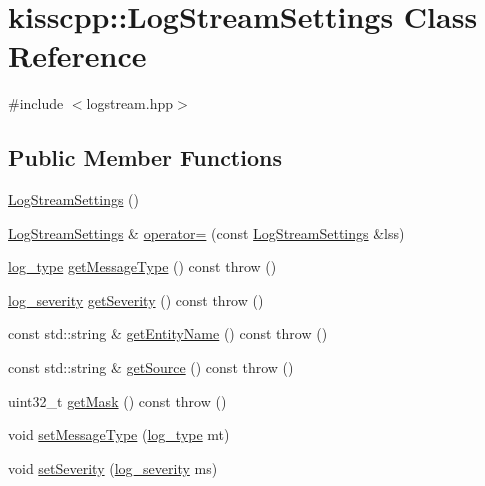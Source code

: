 \hypertarget{classkisscpp_1_1_log_stream_settings}{\section{kisscpp\-:\-:Log\-Stream\-Settings Class Reference}
\label{classkisscpp_1_1_log_stream_settings}
}


{\ttfamily \#include $<$logstream.\-hpp$>$}

\subsection*{Public Member Functions}
\begin{DoxyCompactItemize}
\item 
\hyperlink{classkisscpp_1_1_log_stream_settings_ae0d0e39dbc8875294d0b28579138bdd5}{Log\-Stream\-Settings} ()
\item 
\hyperlink{classkisscpp_1_1_log_stream_settings}{Log\-Stream\-Settings} \& \hyperlink{classkisscpp_1_1_log_stream_settings_ac0fcc9f978329329f027a251620fe3d2}{operator=} (const \hyperlink{classkisscpp_1_1_log_stream_settings}{Log\-Stream\-Settings} \&lss)
\item 
\hyperlink{namespacekisscpp_a18db16d1f4c281bec16e637c56b0cc88}{log\-\_\-type} \hyperlink{classkisscpp_1_1_log_stream_settings_a47d6a4154439d6e4618ddc8fe27df290}{get\-Message\-Type} () const   throw ()
\item 
\hyperlink{namespacekisscpp_a2479a56cdedf21357ca5c68adc699d00}{log\-\_\-severity} \hyperlink{classkisscpp_1_1_log_stream_settings_a601620fefa23f83bdd309a902689e851}{get\-Severity} () const   throw ()
\item 
const std\-::string \& \hyperlink{classkisscpp_1_1_log_stream_settings_a96e829a671c13d1895f64ea34735140f}{get\-Entity\-Name} () const   throw ()
\item 
const std\-::string \& \hyperlink{classkisscpp_1_1_log_stream_settings_a80153606d7e53c45cb3a05a99d770fb2}{get\-Source} () const   throw ()
\item 
uint32\-\_\-t \hyperlink{classkisscpp_1_1_log_stream_settings_ae82b178a57c244164c9c259fefcc218a}{get\-Mask} () const   throw ()
\item 
void \hyperlink{classkisscpp_1_1_log_stream_settings_a45dbf8235751be1255e9b8aa0e64c282}{set\-Message\-Type} (\hyperlink{namespacekisscpp_a18db16d1f4c281bec16e637c56b0cc88}{log\-\_\-type} mt)
\item 
void \hyperlink{classkisscpp_1_1_log_stream_settings_a8512012926ee2b32b5768ba87eaba788}{set\-Severity} (\hyperlink{namespacekisscpp_a2479a56cdedf21357ca5c68adc699d00}{log\-\_\-severity} ms)

\end{DoxyCompactItemize}
